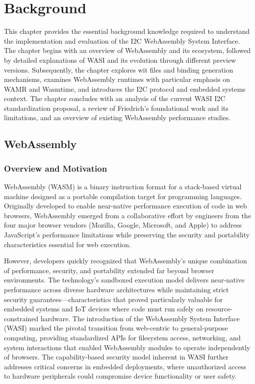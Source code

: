 \chapter{Background}
\label{chap:background}

This chapter provides the essential background knowledge required to understand the implementation and evaluation of the I2C WebAssembly System Interface. The chapter begins with an overview of WebAssembly and its ecosystem, followed by detailed explanations of WASI and its evolution through different preview versions. Subsequently, the chapter explores \acrshort{wit} files and binding generation mechanisms, examines WebAssembly runtimes with particular emphasis on WAMR and Wasmtime, and introduces the I2C protocol and embedded systems context. The chapter concludes with an analysis of the current WASI I2C standardization proposal, a review of Friedrich's foundational work and its limitations, and an overview of existing WebAssembly performance studies.

\section{WebAssembly}
\label{sec:webassembly}

\subsection{Overview and Motivation}
\label{subsec:wasm-overview}

WebAssembly (WASM) is a binary instruction format for a stack-based virtual machine designed as a portable compilation target for programming languages\cite{rossberg2018webassembly}. Originally developed to enable near-native performance execution of code in web browsers, WebAssembly emerged from a collaborative effort by engineers from the four major browser vendors (Mozilla, Google, Microsoft, and Apple) to address JavaScript's performance limitations while preserving the security and portability characteristics essential for web execution.

However, developers quickly recognized that WebAssembly's unique combination of performance, security, and portability extended far beyond browser environments. The technology's sandboxed execution model delivers near-native performance across diverse hardware architectures while maintaining strict security guarantees—characteristics that proved particularly valuable for embedded systems and IoT devices where code must run safely on resource-constrained hardware. The introduction of the WebAssembly System Interface (WASI) marked the pivotal transition from web-centric to general-purpose computing, providing standardized APIs for filesystem access, networking, and system interactions that enabled WebAssembly modules to operate independently of browsers. The capability-based security model inherent in WASI further addresses critical concerns in embedded deployments, where unauthorized access to hardware peripherals could compromise device functionality or user safety.

